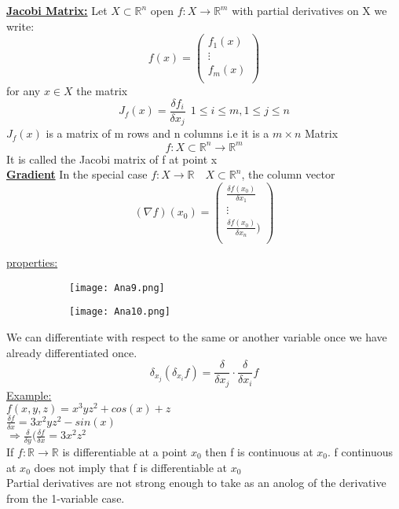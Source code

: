 \documentclass[8pt]{extreport}
\newcommand{\R}{\mathbb{R}}
\begin{document}
\textbf{\underline{Jacobi Matrix:}} Let $X \subset \R^n$ open $f: X \to \R^m$ with partial derivatives on X we write:
$$f(x) = 
 \begin{pmatrix}
  f_1(x) \\ \vdots \\ f_m(x) \\
 \end{pmatrix} $$
for any $x \in X$ the matrix
$$ J_f(x) = \frac{\delta f_i}{\delta x_j} \ \ 1\leq i \leq m, 1 \leq j \leq n$$
$J_f(x)$ is a matrix of m rows and n columns i.e it is a $m\times n$ Matrix 
$$f: X \subset \R^n \rightarrow \R^m$$
It is called the Jacobi matrix of f at point x\\

\textbf{\underline{Gradient}} In the special case $f: X \to \R \quad X \subset \R^n$, the column vector
$$(\nabla f)(x_0) = 
 \begin{pmatrix}
  \frac{\delta f(x_0)}{\delta x_1} \\ \vdots \\\frac{\delta f(x_0)}{\delta x_n}) \\
 \end{pmatrix} $$

\underline{ properties:}

\begin{figure}[H]
\centering
\begin{subfigure}[b]{0.4\linewidth}
\texttt{[image: Ana9.png]}
\end{subfigure}
\begin{subfigure}[b]{0.4\linewidth}
\texttt{[image: Ana10.png]}
\end{subfigure}
\end{figure}


We can differentiate with respect to the same or another variable once we have already differentiated once.
$$ \delta_{x_j} (\delta_{x_i}f) = \frac{\delta}{\delta x_j} \cdot \frac{\delta}{\delta x_i} f$$
\underline{Example:}\\
$f(x,y,z) = x^3yz^2 + cos(x) + z$\\
$\frac{\delta f}{\delta x} = 3x^2yz^2 - sin(x)$\\
$\Rightarrow \frac{\delta}{\delta y}(\frac{\delta f}{\delta x} = 3 x^2z^2$\\

If $f : \R \to \R$ is differentiable at a point $x_0$ then f is continuous at $x_0$. f  continuous at $x_0$ does not imply that f is differentiable at $x_0$\\
Partial derivatives are not strong enough to take as an anolog of the derivative from the 1-variable case.\\
\end{document}
